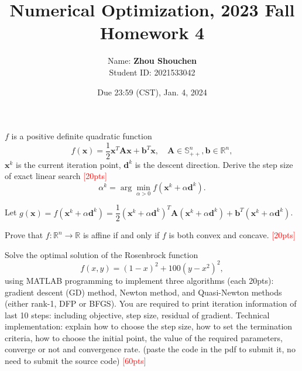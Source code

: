 \documentclass[10pt]{article}
\newenvironment{problem}[2][Problem]{\begin{trivlist}
\item[\hskip \labelsep {\bfseries #1}\hskip \labelsep {\bfseries #2.}]}{\end{trivlist}}
\begin{document}
\title{	Numerical Optimization, 2023 Fall\\Homework 4}
\date{Due 23:59 (CST), Jan. 4, 2024 }

\author{
    Name: \textbf{Zhou Shouchen} \\
	Student ID: 2021533042
}

\maketitle
\newpage


\begin{problem}{1}
    $f$ is a positive definite quadratic function $$f(\pmb x) = \frac{1}{2}\pmb x^T\pmb A\pmb x + \pmb b^T\pmb x,  \quad \pmb A \in \mathbb{S}_{++}^n, \pmb b \in \mathbb{R}^n,$$ $\pmb x^k$ is the current iteration point, $\pmb d^k$ is the descent direction. Derive the step size of exact linear search \textcolor{red}{[20pts]} $$\alpha^k = \arg\min_{\alpha > 0}f(\pmb x^k + \alpha \pmb d^k).$$
\end{problem}

Let $g(\pmb x)=f(\pmb x^k+\alpha\pmb d^k)=\dfrac{1}{2}(\pmb x^k+\alpha\pmb d^k)^T\pmb A(\pmb x^k+\alpha\pmb d^k)+\pmb b^T(\pmb x^k+\alpha\pmb d^k)$.



\newpage

\begin{problem}{2}
    Prove that $f: \mathbb{R}^n \rightarrow \mathbb{R}$ is affine if and only if $f$ is both convex and concave. \textcolor{red}{[20pts]} 
\end{problem}



\newpage

\begin{problem}{3}
    Solve the optimal solution of the Rosenbrock function $$f(x, y) = (1 - x)^2 + 100(y - x^2)^2, $$ using MATLAB programming to implement three algorithms (each 20pts): gradient descent (GD) method, Newton method, and Quasi-Newton methods (either rank-1, DFP or BFGS). You are required to print iteration information of last 10 steps: including objective, step size, residual of gradient. Technical implementation: explain how to choose the step size, how to set the termination criteria, how to choose the initial point, the value of the required parameters, converge or not and convergence rate. (paste the code in the pdf to submit it, no need to submit the source code) \textcolor{red}{[60pts]}
\end{problem}
\end{document}
